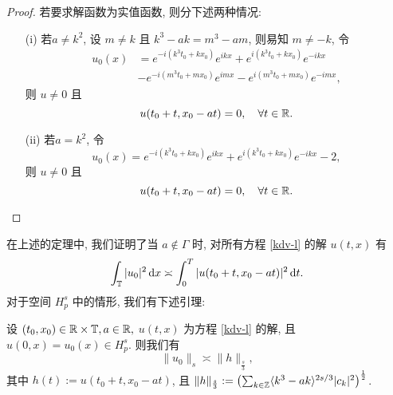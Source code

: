 \begin{proof}
    若要求解函数为实值函数, 则分下述两种情况:
    \begin{enumerate}
    \item [(i)] 若$a\neq k^2$, 设 $m\neq k$ 且 $k^3-ak=m^3-am$, 则易知 $m\neq -k$, 令
    \begin{align*}
        u_0(x)&= e^{-i(k^3t_0+kx_0)} e^{ikx} + e^{i(k^3t_0+kx_0)} e^{-ikx}\\
        &-e^{-i(m^3t_0+mx_0)}e^{imx}-e^{i(m^3t_0+mx_0)}e^{-imx},
    \end{align*}
    则 $u\neq 0$ 且
    \begin{equation*}
        u(t_0+t,x_0-at)=0,\quad\forall t\in \mathbb{R}.
    \end{equation*}
     \item [(ii)] 若$a=k^2$, 令
    \begin{equation*}
        u_0(x)=e^{-i(k^3t_0+kx_0)}e^{ikx} + e^{i(k^3t_0+kx_0)}e^{-ikx}-2,
    \end{equation*}
    则 $u\neq 0$ 且
    \begin{equation*}
        u(t_0+t,x_0-at)=0,\quad\forall t\in\mathbb{R}.
    \end{equation*}
    \end{enumerate}
    \end{proof}
    
    在上述的定理中, 我们证明了当 $a\notin \Gamma$ 时, 对所有方程 \eqref{kdv-l} 的解 $u(t,x)$ 有
    \begin{equation*}
        \int_{\mathbb{T}}|u_0|^2\,\mathrm{d} x\asymp \int_{0}^T|u(t_0+t,x_0-at)|^2\,\mathrm{d} t.
    \end{equation*}
    对于空间 $ H_p^s$ 中的情形, 我们有下述引理:
    \begin{lemma}
    设 $(t_0,x_0)\in \mathbb{R}\times \mathbb{T}, a\in \mathbb{R},$ $u(t,x)$ 为方程 \eqref{kdv-l} 的解, 且 $u(0,x)=u_0(x)\in H_p^s$. 则我们有
    \begin{equation}
        \|u_0\|_{s}\asymp \|h\|_{\frac{s}{3}},
    \end{equation}
    其中 $h(t):=u(t_0+t,x_0-at)$, 且 $\|h\|_{\frac{s}{3}}:=\left( \sum_{k\in \mathbb{Z}}\langle k^3-ak\rangle^{2s/3}|c_k|^2 \right)^{\frac{1}{2}}$.
    \end{lemma}
    
